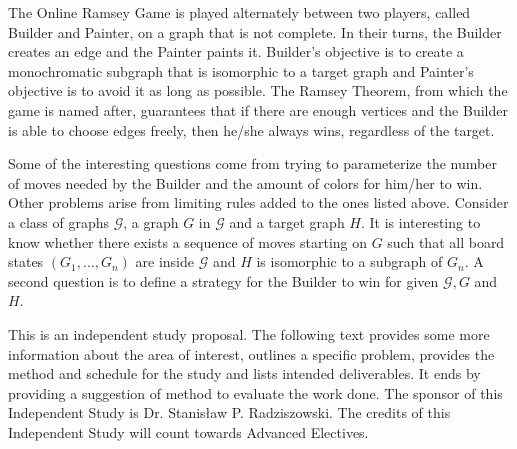 The Online Ramsey Game is played alternately between two players, called Builder and Painter, on a graph that is not complete. In their turns, the Builder creates an edge and the Painter paints it. Builder's objective is to create a monochromatic subgraph that is isomorphic to a target graph and Painter's objective is to avoid it as long as possible. The Ramsey Theorem, from which the game is named after, guarantees that if there are enough vertices and the Builder is able to choose edges freely, then he/she always wins, regardless of the target.

Some of the interesting questions come from trying to parameterize the number of moves needed by the Builder and the amount of colors for him/her to win. Other problems arise from limiting rules added to the ones listed above. Consider a class of graphs $\mathcal{G}$, a graph $G$ in $\mathcal{G}$ and a target graph $H$. It is interesting to know whether there exists a sequence of moves starting on $G$ such that all board states $(G_1, \ldots, G_n)$ are inside $\mathcal{G}$ and $H$ is isomorphic to a subgraph of $G_n$. A second question is to define a strategy for the Builder to win for given $\mathcal{G}, G$ and $H$.

This is an independent study proposal. The following text provides some more information about the area of interest, outlines a specific problem, provides the method and schedule for the study and lists intended deliverables. It ends by providing a suggestion of method to evaluate the work done. The sponsor of this Independent Study is Dr. Stanisław P. Radziszowski. The credits of this Independent Study will count towards Advanced Electives.